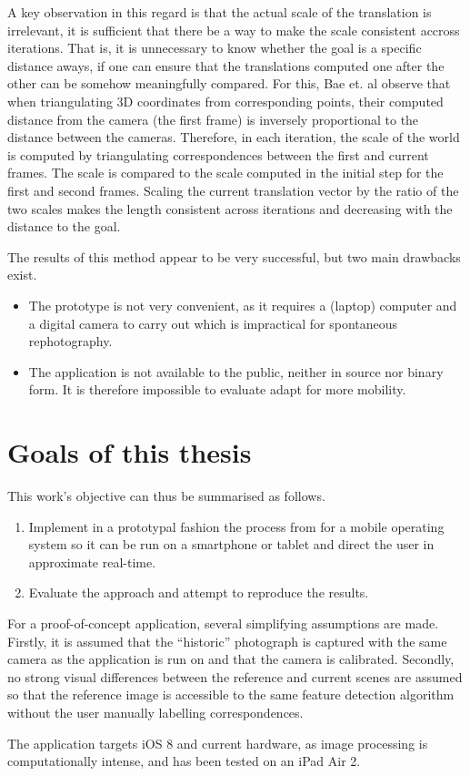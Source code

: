 A key observation in this regard is that the actual scale of the translation is
irrelevant, it is sufficient that there be a way to make the scale consistent
accross iterations. That is, it is unnecessary to know whether the goal is a
specific distance aways, if one can ensure that the translations computed one
after the other can be somehow meaningfully compared. For this, Bae et. al
observe that when triangulating 3D coordinates from corresponding points, their
computed distance from the camera (the first frame) is inversely proportional
to the distance between the cameras. Therefore, in each iteration, the scale of
the world is computed by triangulating correspondences between the first and
current frames. The scale is compared to the scale computed in the initial step
for the first and second frames. Scaling the current translation vector by the
ratio of the two scales makes the length consistent across iterations and
decreasing with the distance to the goal.

The results of this method appear to be very successful, but two main drawbacks
exist.
\begin{itemize}
   \item The prototype is not very convenient, as it requires a (laptop)
      computer and a digital camera to carry out which is impractical for
      spontaneous rephotography.
   \item The application is not available to the public, neither in source nor
      binary form. It is therefore impossible to evaluate adapt for more mobility.
\end{itemize}

\section{Goals of this thesis}

This work's objective can thus be summarised as follows.
\begin{enumerate}
   \item Implement in a prototypal fashion the process from \citep{bae2010} for
      a mobile operating system so it can be run on a smartphone or tablet and
      direct the user in approximate real-time.
   \item Evaluate the approach and attempt to reproduce the results.
\end{enumerate}

For a proof-of-concept application, several simplifying assumptions are made.
Firstly, it is assumed that the ``historic'' photograph is captured with the
same camera as the application is run on and that the camera is calibrated.
Secondly, no strong visual differences between the reference and current scenes
are assumed so that the reference image is accessible to the same feature
detection algorithm without the user manually labelling correspondences. 

The application targets iOS 8 and current hardware, as image processing is
computationally intense, and has been tested on an iPad Air 2.
